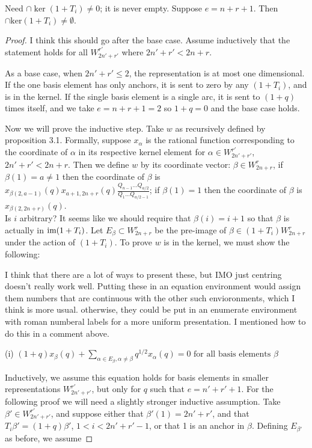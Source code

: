 \documentclass{amsart}
\begin{document}
\vspace{5mm}
\begin{proposition}
  {\color{magenta} Need $\cap \ker (1 + T_i) \neq 0$; it is never empty.}
	Suppose $e=n+r+1$. Then $\cap\text{ker}(1+T_i)\not=\emptyset$.
\end{proposition}

\begin{proof}
  {\color{magenta} I think this should go after the base case.}	
	Assume inductively that the statement holds for all $W_{2n'+r'}^{r'}$ where $2n'+r'<2n+r$.
	
	As a base case, when $2n'+r'\leq 2$, the representation is at most one dimensional. If the one basis element has only anchors, it is sent to zero by any $(1+T_i)$, and is in the kernel. If the single basis element is a single arc, it is sent to $(1+q)$ times itself, and we take $e=n+r+1=2$ so $1+q=0$ and the base case holds.
	
  \vspace{5mm}
	Now we will prove the inductive step. Take $w$ as recursively defined by proposition 3.1. Formally, suppose $x_\alpha$ is the rational function corresponding to the coordinate of $\alpha$ in its respective kernel element for $\alpha\in W_{2n'+r'}^{r'}$, $2n'+r'<2n+r$. Then we define $w$ by its coordinate vector: $\beta\in W_{2n+r}^r$, if $\beta(1)=a\not=1$ then the coordinate of $\beta$ is $x_{\beta(2,a-1)}(q)x_{a+1,2n+r}(q)\frac{Q_{n-1}...Q_{a/2}}{Q_1...Q_{a/2-1}}$; if $\beta(1)=1$ then the coordinate of $\beta$ is $x_{\beta(2,2n+r)}(q)$. 
	\\
	
  {\color{magenta} Is $i$ arbitrary? It seems like we should require that $\beta(i) = i+1$ so that $\beta$ is actually in $\text{im} (1 + T_i)$.}
  Let $E_\beta\subset W_{2n+r}^r$ be the pre-image of $\beta\in (1+T_i)W_{2n+r}^r$ under the action of $(1+T_i)$. To prove $w$ is in the kernel, we must show the following: 
	
  {\color{magenta} I think that there are a lot of ways to present these, but IMO just centring doesn't really work well. Putting these in an equation environment would assign them numbers that are continuous with the other such envioronments, which I think is more usual.
otherwise, they could be put in an enumerate environment with roman numberal labels for a more uniform presentation. I mentioned how to do this in a comment above.} 
  \begin{center}
	(i) $(1+q)x_\beta(q)+\sum_{\alpha\in E_\beta,\alpha\not=\beta}q^{1/2}x_\alpha(q)=0\text{ for all basis elements }\beta$
	\end{center}
	Inductively, we assume this equation holds for basis elements in smaller representations $W_{2n'+r'}^{r'}$, but only for $q$ such that $e=n'+r'+1$. For the following proof we will need a slightly stronger inductive assumption. Take $\beta'\in W_{2n'+r'}^{r'}$, and suppose either that $\beta'(1)=2n'+r'$, and that $T_i\beta'=(1+q)\beta'$, $1<i<2n'+r'-1$, or that 1 is an anchor in $\beta$. Defining $E_{\beta'}$ as before, we assume
	

\end{proof}
\end{document}
